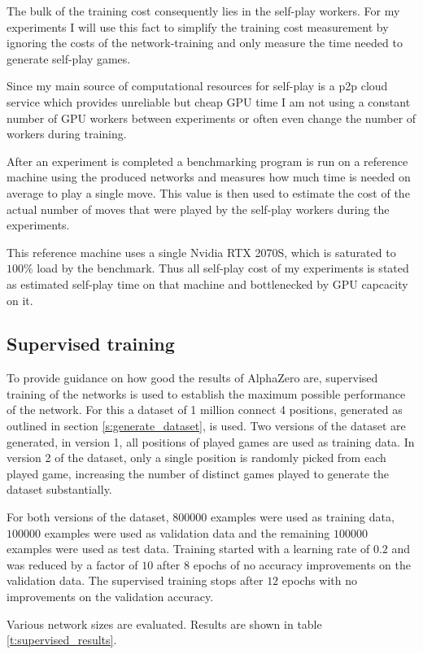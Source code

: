 \documentclass[12pt,onecolumn,oneside,titlepage]{article}
\begin{document}
The bulk of the training cost consequently lies in the self-play workers. For my experiments I will use this fact to simplify the training cost measurement by ignoring the costs of the network-training and only measure the time needed to generate self-play games.

Since my main source of computational resources for self-play is a p2p cloud service which provides unreliable but cheap GPU time I am not using a constant number of GPU workers between experiments or often even change the number of workers during training.

After an experiment is completed a benchmarking program is run on a reference machine using the produced networks and measures how much time is needed on average 
to play a single move. This value is then used to estimate the cost of the actual number of moves that were played by the self-play workers during the experiments.

This reference machine uses a single Nvidia RTX 2070S, which is saturated to $100\%$ load by the benchmark. Thus all self-play cost of my experiments is stated as estimated self-play time on that machine and bottlenecked by GPU capcacity on it.

\subsection{Supervised training}

To provide guidance on how good the results of AlphaZero are, supervised training of the networks is used to establish the maximum possible performance of the network.
For this a dataset of 1 million connect 4 positions, generated as outlined in section \ref{s:generate_dataset}, is used. Two versions of the dataset are generated, in version 1, all positions of played games are used as training data.
In version 2 of the dataset, only a single position is randomly picked from each played game, increasing the number of distinct games played to generate the dataset substantially.

For both versions of the dataset, $800000$ examples were used as training data, $100000$ examples were used as validation data and the remaining $100000$ examples were used as test data.
Training started with a learning rate of $0.2$ and was reduced by a factor of $10$ after $8$ epochs of no accuracy improvements on the validation data. The supervised training stops after $12$ epochs with no improvements on the validation accuracy.

Various network sizes are evaluated. Results are shown in table \ref{t:supervised_results}.
\end{document}
